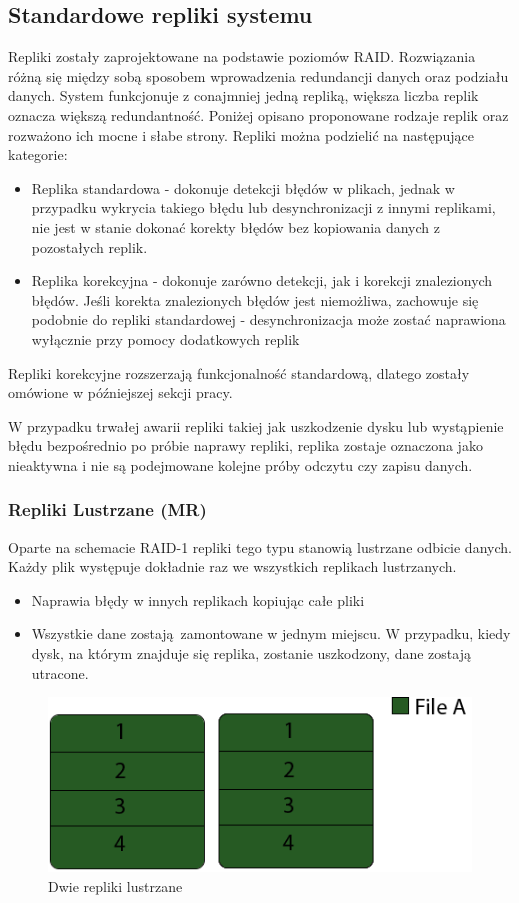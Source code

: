 \subsection{Standardowe repliki systemu}
Repliki zostały zaprojektowane na podstawie poziomów RAID. Rozwiązania różną się 
między sobą sposobem wprowadzenia redundancji danych oraz podziału danych. 
System funkcjonuje z conajmniej jedną repliką, większa liczba replik oznacza większą redundantność. 
Poniżej opisano proponowane rodzaje replik oraz rozważono ich mocne i słabe strony. 
Repliki można podzielić na następujące kategorie:
\begin{itemize}
    \item Replika standardowa - dokonuje detekcji błędów w plikach, 
    jednak w przypadku wykrycia takiego błędu lub desynchronizacji z innymi replikami, 
    nie jest w stanie dokonać korekty błędów bez kopiowania danych z pozostałych replik.
    \item Replika korekcyjna - dokonuje zarówno detekcji, 
    jak i korekcji znalezionych błędów. 
    Jeśli korekta znalezionych błędów jest niemożliwa, zachowuje się 
    podobnie do repliki standardowej - desynchronizacja może zostać naprawiona wyłącznie 
    przy pomocy dodatkowych replik
\end{itemize}
Repliki korekcyjne rozszerzają funkcjonalność standardową, dlatego zostały omówione w późniejszej sekcji pracy. 

W przypadku trwałej awarii repliki takiej jak uszkodzenie dysku lub wystąpienie błędu bezpośrednio po próbie naprawy repliki, replika zostaje oznaczona jako nieaktywna i nie są podejmowane kolejne próby odczytu czy zapisu danych.
\subsubsection{Repliki Lustrzane (MR)}
Oparte na schemacie RAID-1 repliki tego typu stanowią lustrzane odbicie danych. 
Każdy plik występuje dokładnie raz we wszystkich replikach lustrzanych.
\begin{itemize}
        \item Naprawia błędy w innych replikach kopiując całe pliki
        \item Wszystkie dane zostają zamontowane w jednym miejscu. 
        W przypadku, kiedy dysk, na którym znajduje się replika, zostanie uszkodzony, 
        dane zostają utracone.
\end{itemize}

\begin{figure}[h!]
        \centering
        \includegraphics{raid-1.png}
        \caption{Dwie repliki lustrzane}
        \label{fig:raid1}
\end{figure}

